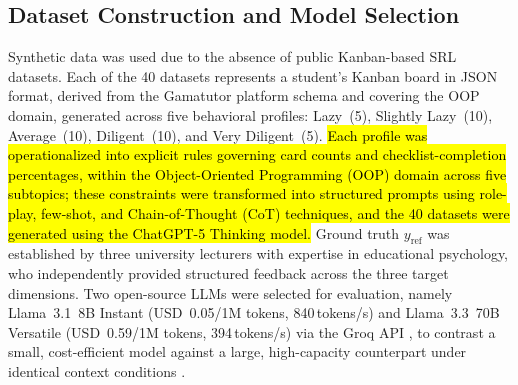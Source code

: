 \documentclass[conference,a4paper]{IEEEtran}
\begin{document}

\subsection{Dataset Construction and Model Selection}
\label{sec:dataset}

%
%
%

Synthetic data was used due to the absence of public
Kanban-based SRL datasets. Each of the 40 datasets
represents a student's Kanban board in JSON format,
derived from the Gamatutor platform schema and covering
the OOP domain, generated across five behavioral
profiles: Lazy~(5), Slightly Lazy~(10), Average~(10),
Diligent~(10), and Very Diligent~(5). \hl{Each profile
was operationalized into explicit rules governing
card counts and checklist-completion percentages,
within the Object-Oriented Programming (OOP) domain
across five subtopics; these constraints were
transformed into structured prompts using role-play,
few-shot, and Chain-of-Thought (CoT) techniques, and
the 40 datasets were generated using the ChatGPT-5
Thinking model.} Ground truth
$y_{\text{ref}}$ was established by three university
lecturers with expertise in educational psychology, who
independently provided structured feedback across the
three target dimensions. Two open-source LLMs were
selected for evaluation, namely Llama~3.1~8B Instant
(USD~0.05/1M tokens, 840\,tokens/s) and Llama~3.3~70B Versatile
(USD~0.59/1M tokens, 394\,tokens/s) via the Groq API
\cite{groq_pricing}, to contrast a small, cost-efficient
model against a large, high-capacity counterpart under
identical context conditions \cite{tang2025fewshot,
pawlik2025choice}.
\end{document}
